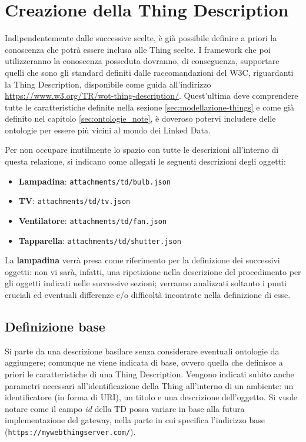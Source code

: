 \documentclass[12pt,a4paper,openright,oneside]{report}
\begin{document}
\section{Creazione della Thing Description}
Indipendentemente dalle successive scelte, è già possibile definire a priori la conoscenza che potrà essere inclusa alle Thing scelte. I framework che poi utilizzeranno la conoscenza posseduta dovranno, di conseguenza, supportare quelli che sono gli standard definiti dalle raccomandazioni del W3C, riguardanti la Thing Description, disponibile come guida all'indirizzo \url{https://www.w3.org/TR/wot-thing-description/}. Quest'ultima deve comprendere tutte le caratteristiche definite nella sezione \ref{sec:modellazione-things} e come già definito nel capitolo \ref{sec:ontologie_note}, è doveroso potervi includere delle ontologie per essere più vicini al mondo dei Linked Data.

Per non occupare inutilmente lo spazio con tutte le descrizioni all'interno di questa relazione, si indicano come allegati le seguenti descrizioni degli oggetti:

\begin{itemize}
	\setlength\itemsep{-0.3em}
	
	\item \textbf{Lampadina}: \texttt{attachments/td/bulb.json}
	
	\item \textbf{TV}: \texttt{attachments/td/tv.json}
	
	\item \textbf{Ventilatore}: \texttt{attachments/td/fan.json}
	
	\item \textbf{Tapparella}: \texttt{attachments/td/shutter.json}
\end{itemize}

La \textbf{lampadina} verrà presa come riferimento per la definizione dei successivi oggetti: non vi sarà, infatti, una ripetizione nella descrizione del procedimento per gli oggetti indicati nelle successive sezioni; verranno analizzati soltanto i punti cruciali ed eventuali differenze e/o difficoltà incontrate nella definizione di esse.

\subsection{Definizione base}
Si parte da una descrizione basilare senza considerare eventuali ontologie da aggiungere; comunque ne viene indicata di base, ovvero quella che definisce a priori le caratteristiche di una Thing Description. Vengono indicati subito anche parametri necessari all'identificazione della Thing all'interno di un ambiente: un identificatore (in forma di URI), un titolo e una descrizione dell'oggetto. Si vuole notare come il campo \textit{id} della TD possa variare in base alla futura implementazione del gateway, nella parte in cui specifica l'indirizzo base (\texttt{https://mywebthingserver.com/}).\\
\end{document}
